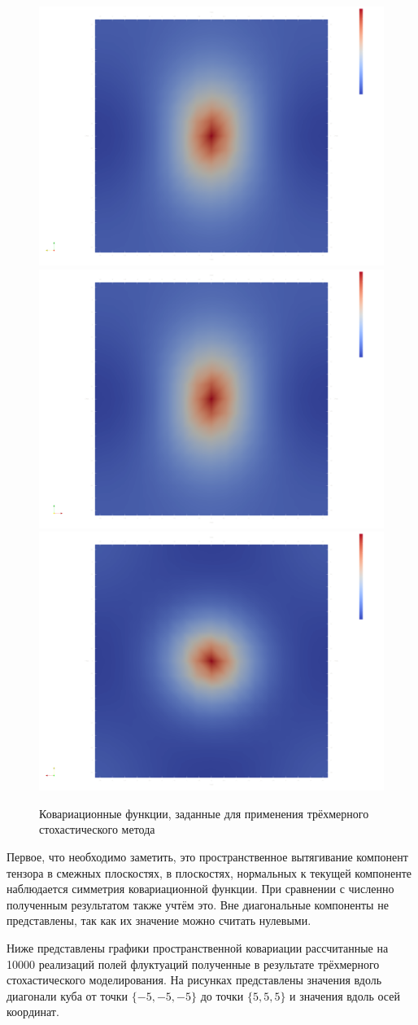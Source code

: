 \begin{figure}[!h]
{         
        {\includegraphics[width=0.32\linewidth]{images/kriging/3components/exact_cov_33_xx.png}}
        \hfill
        {\includegraphics[width=0.32\linewidth]{images/kriging/3components/exact_cov_33_yy.png}}
        \hfill
        {\includegraphics[width=0.32\linewidth]{images/kriging/3components/exact_cov_33_zz.png}}
        \hfill
    }
    
    \onehalfspacing{}
    \caption{Ковариационные функции, заданные для применения трёхмерного стохастического метода}
    \label{img:exact_covariance_comparison_heat_maps}  
\end{figure}

Первое, что необходимо заметить, это пространственное вытягивание компонент тензора в смежных плоскостях, в плоскостях, нормальных к текущей компоненте наблюдается симметрия ковариационной функции. При сравнении с численно полученным результатом также учтём это. Вне диагональные компоненты не представлены, так как их значение можно считать нулевыми.

Ниже представлены графики пространственной ковариации рассчитанные на 10000 реализаций полей флуктуаций полученные в результате трёхмерного стохастического моделирования. На рисунках представлены значения вдоль диагонали куба от точки $\{-5, -5, -5\}$ до точки $\{ 5, 5, 5 \}$ и значения вдоль осей координат.

